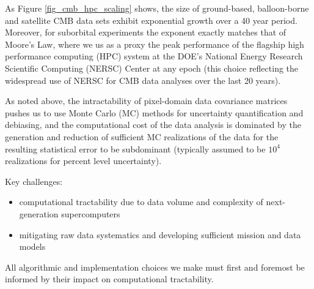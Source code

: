 As Figure \ref{fig_cmb_hpc_scaling} shows, the size of ground-based, balloon-borne and satellite CMB data sets exhibit exponential growth over a 40 year period. Moreover, for suborbital experiments the exponent exactly matches that of Moore's Law, where we us as a proxy the peak performance of the flagship high performance computing (HPC) system at the DOE's National Energy Research Scientific Computing (NERSC) Center at any epoch (this choice reflecting the widespread use of NERSC for CMB data analyses over the last 20 years). 

As noted above, the intractability of pixel-domain data covariance matrices pushes us to use Monte Carlo (MC) methods for uncertainty quantification and debiasing, and the computational cost of the data analysis is dominated by the generation and reduction of sufficient MC realizations of the data for the resulting statistical error to be subdominant (typically assumed to be $10^4$ realizations for percent level uncertainty). 

Key challenges:
\begin{itemize}
\item computational tractability due to data volume and complexity of next-generation supercomputers
\item mitigating raw data systematics and developing sufficient mission and data models
\end{itemize}

All algorithmic and implementation choices we make must first and foremost be informed by their impact on computational tractability.

%



